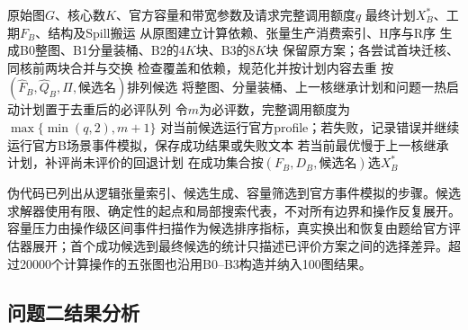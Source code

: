 \begin{algorithm}[H]\caption{问题二的核级驻留候选与官方评价}\label{alg:b-solve}
\begin{algorithmic}[1]
\REQUIRE 原始图$G$、核心数$K$、官方容量和带宽参数及请求完整调用额度$q$
\ENSURE 最终计划$X_B^*$、工期$F_B$、结构及Spill搬运
\STATE 从原图建立计算依赖、张量生产消费索引、H序与R序
\STATE 生成B0整图、B1分量装桶、B2的$4K$块、B3的$8K$块
\STATE 保留原方案；各尝试首块迁核、同核前两块合并与交换
\STATE 检查覆盖和依赖，规范化并按计划内容去重
\ENDFOR
\STATE 按$(\widehat F_B,\widehat Q_B,\Pi,\text{候选名})$排列候选
\STATE 将整图、分量装桶、上一核继承计划和问题一热启动计划置于去重后的必评队列
\STATE 令$m$为必评数，完整调用额度为$\max\{\min(q,2),m+1\}$
\STATE 对当前候选运行官方profile；若失败，记录错误并继续
\STATE 运行官方B场景事件模拟，保存成功结果或失败文本
\ENDWHILE
\STATE 若当前最优慢于上一核继承计划，补评尚未评价的回退计划
\STATE 在成功集合按$(F_B,D_B,\text{候选名})$选$X_B^*$
\end{algorithmic}\end{algorithm}

伪代码已列出从逻辑张量索引、候选生成、容量筛选到官方事件模拟的步骤。候选求解器使用有限、确定性的起点和局部搜索代表，不对所有边界和操作反复展开。容量压力由操作级区间事件扫描作为候选排序指标，真实换出和恢复由题给官方评估器展开；首个成功候选到最终候选的统计只描述已评价方案之间的选择差异。超过20000个计算操作的五张图也沿用B0--B3构造并纳入100图结果。
\FloatBarrier

\subsection{问题二结果分析}

